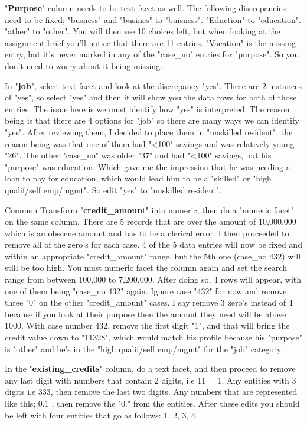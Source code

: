 \documentclass[12pt, a4paper]{article}
\begin{document}
    "\textbf{Purpose}" column needs to be text facet as well. The following discrepancies need to be fixed; "busness" and "busines" to "buisness". "Eduction" to "education". "ather" to "other". You will then see 10 choices left, but when looking at the assignment brief you'll notice that there are 11 entries. "Vacation" is the missing entry, but it's never marked in any of the "case\_no" entries for "purpose". So you don't need to worry about it being missing.
    
    In "\textbf{job}", select text facet and look at the discrepancy "yes". There are 2 instances of "yes", so select "yes" and then it will show you the data rows for both of those entries. The issue here is we must identify how "yes" is interpreted. The reason being is that there are 4 options for "job" so there are many ways we can identify "yes". After reviewing them, I decided to place them in "unskilled resident", the reason being was that one of them had "<100" savings and was relatively young "26". The other "case\_no" was older "37" and had "<100" savings, but his "purpose" was education. Which gave me the impression that he was needing a loan to pay for education, which would lead him to be a "skilled" or "high qualif/self emp/mgmt". So edit "yes" to "unskilled resident".
    
    Common Transform "\textbf{credit\_amoun}t" into numeric, then do a "numeric facet" on the same column. There are 5 records that are over the amount of 10,000,000 which is an obscene amount and has to be a clerical error. I then proceeded to remove all of the zero's for each case. 4 of the 5 data entries will now be fixed and within an appropriate "credit\_amount" range, but the 5th one (case\_no 432) will still be too high. You must numeric facet the column again and set the search range from between 100,000 to 7,200,000. After doing so, 4 rows will appear, with one of them being "case\_no 432" again. Ignore case "432" for now and remove three "0" on the other "credit\_amount" cases. I say remove 3 zero's instead of 4 because if you look at their purpose then the amount they need will be above 1000. With case number 432, remove the first digit "1", and that will bring the credit value down to "11328", which would match his profile because his "purpose" is "other" and he's in the "high qualif/self emp/mgmt" for the "job" category.
    
    In the "\textbf{existing\_credits}" column, do a text facet, and then proceed to remove any last digit with numbers that contain 2 digits, i.e 11 = 1.  Any entities with 3 digits i.e  333, then remove the last two digits. Any numbers that are represented like this; 0.1 , then remove the "0." from the entities. After these edits you should be left with four entities that go as follows: 1, 2, 3, 4.
    
\end{document}
